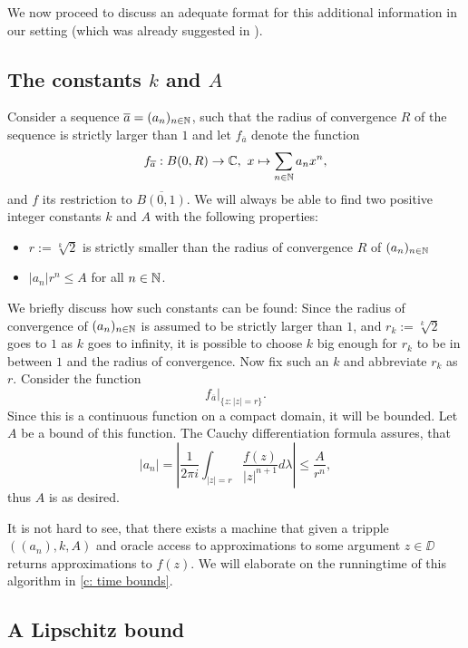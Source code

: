 	We now proceed to discuss an adequate format for this additional information in our setting (which was already suggested in \cite{gevrey}).

	\subsection[The constants k and A]{The constants $k$ and $A$}\label{sec: The constants k and A}

		Consider a sequence $\overline a = (a_n)_{n\in \operatorname{\mathbb{N}}}$, such that the radius of convergence $R$ of the sequence is strictly larger than $1$ and let $f_{\overline a}$ denote the function
		\[ f_{\overline a}: B(0,R) \to \operatorname{\mathbb{C}},~ x \mapsto \sum_{n\in \operatorname{\mathbb{N}}} a_n x^n, \]
		and $f$ its restriction to $\overline{B(0,1)}$. We will always be able to find two positive integer constants $k$ and $A$ with the following properties:
		\begin{itemize}
		\item $r:=\sqrt[k]{2}$ is strictly smaller than the radius of convergence $R$ of $(a_n)_{n\in \operatorname{\mathbb{N}}}$
		\item $|a_n|  r^n \leq A$ for all $n\in \operatorname{\mathbb{N}}$.
		\end{itemize}
		We briefly discuss how such constants can be found:
		Since the radius of convergence of $(a_n)_{n\in \operatorname{\mathbb{N}}}$ is assumed to be strictly larger than $1$, and $r_k:=\sqrt[k] 2$ goes to $1$ as $k$ goes to infinity, it is possible to choose $k$ big enough for $r_k$ to be in between $1$ and the radius of convergence.
		Now fix such an $k$ and abbreviate $r_k$ as $r$.
		Consider the function
		\[ f_{\overline a}|_{\{z:|z| = r\}}. \]
		Since this is a continuous function on a compact domain, it will be bounded.
		Let $A$ be a bound of this function.
		The Cauchy differentiation formula assures, that
		\[ |a_n |=  \left|\frac 1 {2\pi i}\int_{|z| = r} \frac{f(z)}{|z|^{n+1}} d\lambda\right| \leq \frac A {r^n}, \]
		thus $A$ is as desired.

		It is not hard to see, that there exists a machine that given a tripple $((a_n),k,A)$ and oracle access to approximations to some argument $z\in\DD$ returns approximations to $f(z)$.
		We will elaborate on the runningtime of this algorithm in \cref{c: time bounds}.

	\subsection{A Lipschitz bound}

